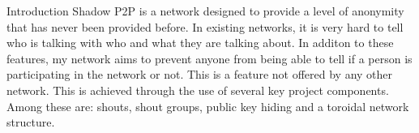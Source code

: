\documentclass[ %
                    author={Luke Murray},
                supervisor={Dr. Simon Hollis},
                     title={Shadow Peer-to-Peer Networks},
                  subtitle={},
                    degree={MEng},
                      year={2013} ]{poster}
\begin{document}

\begin{frame}{} 

\vfill

\begin{columns}[t]
    \begin{column}{0.900\linewidth}
    \begin{block}{\normalsize Introduction}
    \small Shadow P2P is a network designed to provide a level of anonymity that has never been provided before. In existing networks, it is very hard to tell who is talking with who and what they are talking about. In additon to these features, my network aims to prevent anyone from being able to tell if a person is participating in the network or not. This is a feature not offered by any other network. This is achieved through the use of several key project components. Among these are: shouts, shout groups, public key hiding and a toroidal network structure.
    \end{block}
    \end{column}
\end{columns}

\vfill


\end{frame}
\end{document}
